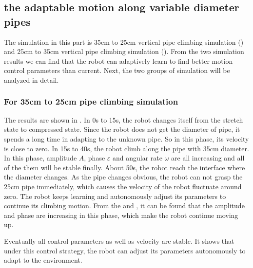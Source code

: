 \subsection{the adaptable motion along variable diameter pipes}

The simulation in this part is 35cm to 25cm vertical pipe climbing simulation () and 25cm to 35cm vertical pipe climbing simulation (). From the two simulation results we can find that the robot can adaptively learn to find better motion control parameters than current. Next, the two groups of simulation will be analyzed in detail.

\subsubsection{For 35cm to 25cm pipe climbing simulation}

The results are shown in . In 0s to 15s, the robot changes itself from the stretch state to compressed state. Since the robot does not get the diameter of pipe, it spends a long time in adapting to the unknown pipe. So in this phase, its velocity is close to zero. In 15s to 40s, the robot climb along the pipe with 35cm diameter. In this phase, amplitude $A$, phase $\varepsilon$ and angular rate $\omega$ are all increasing and all of the them will be stable finally. About 50s, the robot reach the interface where the diameter changes. As the pipe changes obvious, the robot can not grasp the 25cm pipe immediately, which causes the velocity of the robot fluctuate around zero. The robot keeps learning and autonomously adjust its parameters to continue its climbing motion. From the  and , it can be found that the amplitude and phase are increasing in this phase, which make the robot continue moving up.

Eventually all control parameters as well as velocity are stable. It shows that under this control strategy, the robot can adjust its parameters autonomously to adapt to the environment.

